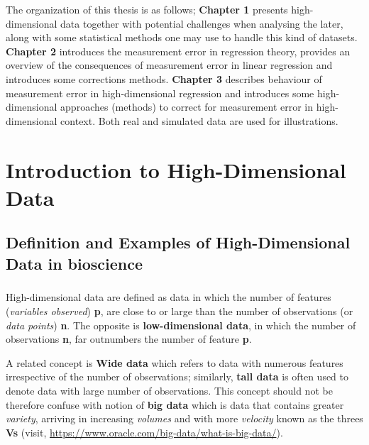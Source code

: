 \documentclass[12pt]{report}
\renewcommand{\emph}{\textit}
\begin{document}
	The organization of this thesis is as follows; \textbf{Chapter 1} presents high-dimensional data together with potential challenges when analysing the later, along with some statistical methods one may use to handle this kind of datasets. \textbf{Chapter 2} introduces the measurement error in regression theory, provides an overview of the consequences of measurement error in linear regression and introduces some corrections methods. \textbf{Chapter 3} describes behaviour of measurement error in high-dimensional regression and introduces some high-dimensional approaches (methods) to correct for measurement error in high-dimensional context. Both real and simulated data are used for illustrations.
	\chapter{Introduction to High-Dimensional Data}
	\section{Definition and Examples of High-Dimensional Data in bioscience}
	\paragraph*{}
	High-dimensional data are defined as data in which the number of features (\emph{variables observed}) \textbf{p}, are close to or large than the number of observations (or \emph{data points}) \textbf{n}. The opposite is \textbf{low-dimensional data}, in which the number of observations \textbf{n}, far outnumbers the number of feature \textbf{p}.
	
	A related concept is \textbf{Wide data} which refers to data with numerous features irrespective of the number of observations; similarly, \textbf{tall data} is often used to denote data with large number of observations. This concept should not be therefore confuse with notion of \textbf{big data} which is data that contains greater \textit{variety}, arriving in increasing \textit{volumes} and with more \textit{velocity} known as the threes \textbf{Vs} (visit, \url{https://www.oracle.com/big-data/what-is-big-data/}).
	
\end{document}
